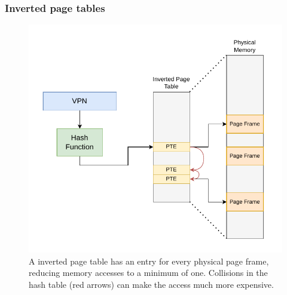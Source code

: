\subsubsection{Inverted page tables}
\begin{figure}[t]
    \centering
    \includegraphics[scale=1]{figures/inverted_pt.pdf}
    \caption[Simple Inverted Page Table Design]{A inverted page table has an entry for every physical
        page frame, reducing memory accesses to a minimum of one. Collisions in the hash table (red arrows) can
        make the access much more expensive. }
    \label{fig:fund:pagetree}
\end{figure}






